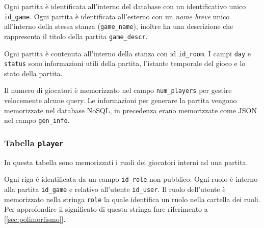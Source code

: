 Ogni partita è identificata all'interno del database con un identificativo unico \texttt{id\_game}. Ogni partita è identificata all'esterno con un \emph{nome breve} unico all'interno della stessa stanza (\texttt{game\_name}), inoltre ha una descrizione che rappresenta il titolo della partita \texttt{game\_descr}.

Ogni partita è contenuta all'interno della stanza con id \texttt{id\_room}. I campi \texttt{day} e \texttt{status} sono informazioni utili della partita, l'istante temporale del gioco e lo stato della partita.

Il numero di giocatori è memorizzato nel campo \texttt{num\_players} per gestire velocemente alcune query. Le informazioni per generare la partita vengono memorizzate nel database NoSQL, in precedenza erano memorizzate come JSON nel campo \texttt{gen\_info}.



\subsubsection{Tabella \texttt{player}}

In questa tabella sono memorizzati i ruoli dei giocatori interni ad una partita. 

Ogni riga è identificata da un campo \texttt{id\_role} non pubblico. Ogni ruolo è interno alla partita \texttt{id\_game} e relativo all'utente \texttt{id\_user}. Il ruolo dell'utente è memorizzato nella stringa \texttt{role} la quale identifica un ruolo nella cartella dei ruoli. Per approfondire il significato di questa stringa fare riferimento a [\ref{sec:polimorfismo}].


